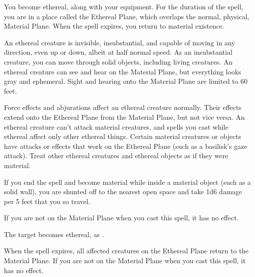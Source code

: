 \begin{spellheader}
    \spelldur{\durshort \dismissable}
\end{spellheader}
\begin{spelleffects}
    \spelleffect You become ethereal, along with your equipment. For the duration of the spell, you are in a place called the Ethereal Plane, which overlaps the normal, physical, Material Plane. When the spell expires, you return to material existence.
    \par An ethereal creature is invisible, insubstantial, and capable of moving in any direction, even up or down, albeit at half normal speed. As an insubstantial creature, you can move through solid objects, including living creatures. An ethereal creature can see and hear on the Material Plane, but everything looks gray and ephemeral. Sight and hearing onto the Material Plane are limited to 60 feet.
    \par Force effects and abjurations affect an ethereal creature normally. Their effects extend onto the Ethereal Plane from the Material Plane, but not vice versa. An ethereal creature can't attack material creatures, and spells you cast while ethereal affect only other ethereal things. Certain material creatures or objects have attacks or effects that work on the Ethereal Plane (such as a basilisk's gaze attack). Treat other ethereal creatures and ethereal objects as if they were material. 
    \par If you end the spell and become material while inside a material object (such as a solid wall), you are shunted off to the nearest open space and take 1d6 damage per 5 feet that you so travel.
\end{spelleffects}
\begin{spellfooter}
    \spellnotes If you are not on the Material Plane when you cast this spell, it has no effect.
\end{spellfooter}

\begin{spellheader}
\end{spellheader}
\begin{spelleffects}
    \spelleffect The target becomes ethereal, as .
\end{spelleffects}
\begin{spellfooter}
    \spellnotes When the spell expires, all affected creatures on the Ethereal Plane return to the Material Plane. If you are not on the Material Plane when you cast this spell, it has no effect.
\end{spellfooter}

